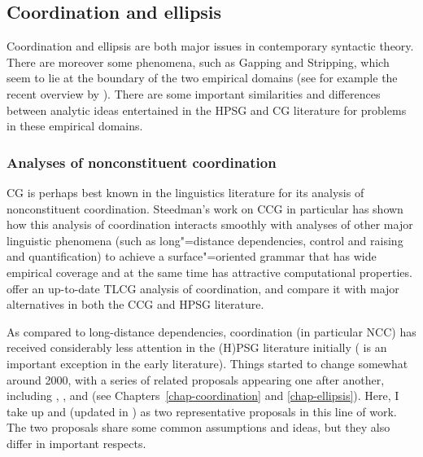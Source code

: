 \documentclass[output=paper]{langsci/langscibook}
\begin{document}
\subsection{Coordination and ellipsis}

Coordination and ellipsis are both major issues in contemporary
syntactic theory. There are moreover some phenomena, such as Gapping
and Stripping, which seem to lie at the boundary of the two
empirical domains (see for example the recent overview
by \citet{johnson-ellipsis-handbook}). There are some important similarities and
differences between analytic ideas entertained in the HPSG and CG
literature for problems in these empirical domains.


\subsubsection{Analyses of nonconstituent coordination  \label{NCCcomparison}}

CG is perhaps best known in the linguistics literature for its
analysis of nonconstituent coordination. Steedman's work on CCG
\citep{Steedman97a,Steedman2000a-u,steedman2012} in particular has
shown how this analysis of coordination interacts smoothly with
analyses of other major linguistic phenomena (such as long"=distance
dependencies, control and raising and quantification) to achieve a
surface"=oriented grammar that has wide empirical coverage and at the
same time has attractive computational properties.
\citet{kubota-levine-coord,KubotaLevineBook} offer an up-to-date TLCG
analysis of coordination, and compare it with major alternatives in
both the CCG and HPSG literature.


As compared to long-distance dependencies, coordination (in particular
NCC) has received considerably less attention in the (H)PSG literature
initially (\citet{sgww} is an important exception in the early
literature). Things started to change somewhat around 2000, with a
series of related proposals appearing one after another, including
\citet{Yatabe2001a}, \citet{BS2004a}, 
\citet{chaves07} and \citet{Crysmann2003c} (see Chapters~\ref{chap-coordination} and
\ref{chap-ellipsis}). Here, I take up \citet{BS2004a}  and
\citet{Yatabe2001a} (updated in \citet{yatabe-tam2017}) as two
representative proposals in this line of work. The two proposals share
some common assumptions and ideas, but they also differ in important
respects.
\end{document}

